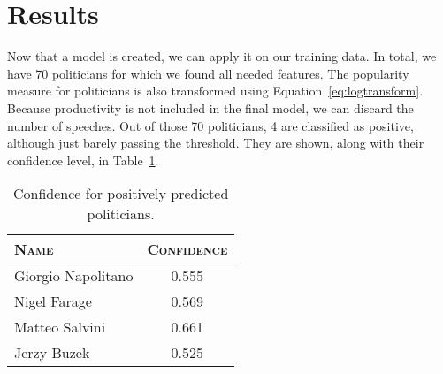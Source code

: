 \section{Results}
\label{sec:results}
Now that a model is created, we can apply it on our training data. In total, we have 70 politicians for which we found all needed features. The popularity measure for politicians is also transformed using Equation~\ref{eq:logtransform}. Because productivity is not included in the final model, we can discard the number of speeches. Out of those 70 politicians, 4 are classified as positive, although just barely passing the threshold. They are shown, along with their confidence level, in Table~\ref{tbl:confidences}.

\begin{table}[H]
\centering
\begin{tabular}{l|c}
\textsc{\textbf{Name}}&\textsc{\textbf{Confidence}}\\ \hline
\rule{0pt}{4mm}Giorgio Napolitano&0.555\\
Nigel Farage&0.569\\
Matteo Salvini&0.661\\
Jerzy Buzek&0.525
\end{tabular}
\caption{Confidence for positively predicted politicians.}
\label{tbl:confidences}
\end{table}